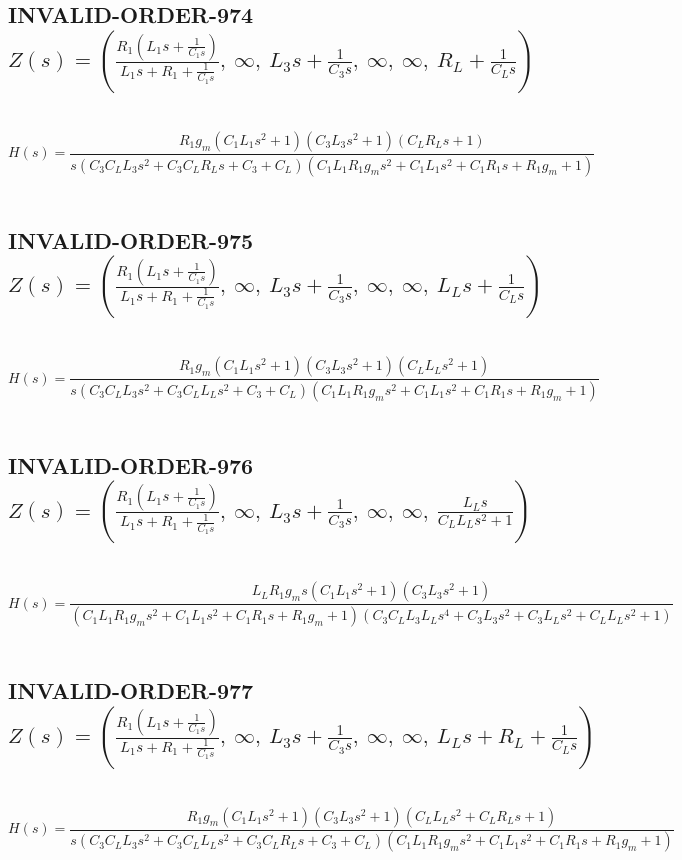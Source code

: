 \documentclass{article}
\begin{document}
\subsection{INVALID-ORDER-974 $Z(s) = \left( \frac{R_{1} \left(L_{1} s + \frac{1}{C_{1} s}\right)}{L_{1} s + R_{1} + \frac{1}{C_{1} s}}, \  \infty, \  L_{3} s + \frac{1}{C_{3} s}, \  \infty, \  \infty, \  R_{L} + \frac{1}{C_{L} s}\right)$ } \ 
\textbf{\[H(s) = \frac{R_{1} g_{m} \left(C_{1} L_{1} s^{2} + 1\right) \left(C_{3} L_{3} s^{2} + 1\right) \left(C_{L} R_{L} s + 1\right)}{s \left(C_{3} C_{L} L_{3} s^{2} + C_{3} C_{L} R_{L} s + C_{3} + C_{L}\right) \left(C_{1} L_{1} R_{1} g_{m} s^{2} + C_{1} L_{1} s^{2} + C_{1} R_{1} s + R_{1} g_{m} + 1\right)}\] } \ 
\subsection{INVALID-ORDER-975 $Z(s) = \left( \frac{R_{1} \left(L_{1} s + \frac{1}{C_{1} s}\right)}{L_{1} s + R_{1} + \frac{1}{C_{1} s}}, \  \infty, \  L_{3} s + \frac{1}{C_{3} s}, \  \infty, \  \infty, \  L_{L} s + \frac{1}{C_{L} s}\right)$ } \ 
\textbf{\[H(s) = \frac{R_{1} g_{m} \left(C_{1} L_{1} s^{2} + 1\right) \left(C_{3} L_{3} s^{2} + 1\right) \left(C_{L} L_{L} s^{2} + 1\right)}{s \left(C_{3} C_{L} L_{3} s^{2} + C_{3} C_{L} L_{L} s^{2} + C_{3} + C_{L}\right) \left(C_{1} L_{1} R_{1} g_{m} s^{2} + C_{1} L_{1} s^{2} + C_{1} R_{1} s + R_{1} g_{m} + 1\right)}\] } \ 
\subsection{INVALID-ORDER-976 $Z(s) = \left( \frac{R_{1} \left(L_{1} s + \frac{1}{C_{1} s}\right)}{L_{1} s + R_{1} + \frac{1}{C_{1} s}}, \  \infty, \  L_{3} s + \frac{1}{C_{3} s}, \  \infty, \  \infty, \  \frac{L_{L} s}{C_{L} L_{L} s^{2} + 1}\right)$ } \ 
\textbf{\[H(s) = \frac{L_{L} R_{1} g_{m} s \left(C_{1} L_{1} s^{2} + 1\right) \left(C_{3} L_{3} s^{2} + 1\right)}{\left(C_{1} L_{1} R_{1} g_{m} s^{2} + C_{1} L_{1} s^{2} + C_{1} R_{1} s + R_{1} g_{m} + 1\right) \left(C_{3} C_{L} L_{3} L_{L} s^{4} + C_{3} L_{3} s^{2} + C_{3} L_{L} s^{2} + C_{L} L_{L} s^{2} + 1\right)}\] } \ 
\subsection{INVALID-ORDER-977 $Z(s) = \left( \frac{R_{1} \left(L_{1} s + \frac{1}{C_{1} s}\right)}{L_{1} s + R_{1} + \frac{1}{C_{1} s}}, \  \infty, \  L_{3} s + \frac{1}{C_{3} s}, \  \infty, \  \infty, \  L_{L} s + R_{L} + \frac{1}{C_{L} s}\right)$ } \ 
\textbf{\[H(s) = \frac{R_{1} g_{m} \left(C_{1} L_{1} s^{2} + 1\right) \left(C_{3} L_{3} s^{2} + 1\right) \left(C_{L} L_{L} s^{2} + C_{L} R_{L} s + 1\right)}{s \left(C_{3} C_{L} L_{3} s^{2} + C_{3} C_{L} L_{L} s^{2} + C_{3} C_{L} R_{L} s + C_{3} + C_{L}\right) \left(C_{1} L_{1} R_{1} g_{m} s^{2} + C_{1} L_{1} s^{2} + C_{1} R_{1} s + R_{1} g_{m} + 1\right)}\] } \ 
\end{document}
